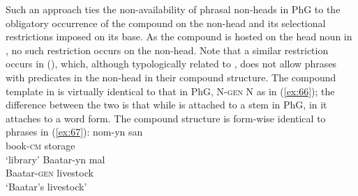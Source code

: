 \documentclass[output=paper]{LSP/langsci}
\begin{document}
Such an approach ties the non-availability of phrasal non-heads in PhG to the obligatory occurrence of the compound  on the non-head and its selectional restrictions imposed on its base. As the compound  is hosted on the head noun in , no such restriction occurs on the non-head. Note that a similar restriction occurs in  (), which, although typologically related to , does not allow phrases with predicates in the non-head in their compound structure. The compound template in  is virtually identical to that in PhG, N-\textsc{gen} N as in (\ref{ex:66}); the difference between the two is that while  is attached to a stem in PhG, in  it attaches to a word form. The compound structure is form-wise identical to  phrases in (\ref{ex:67}):
\ea\label{ex:66}
	\gll nom-yn san\\
			book-\textsc{cm} storage\\
	\glt `library'
\z
\ea\label{ex:67}
	\gll Baatar-yn mal\\
		Baatar-\textsc{gen} livestock\\
	\glt `Baatar's livestock'
	
\end{document}

